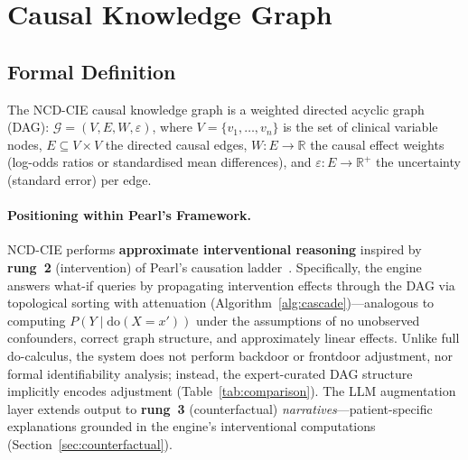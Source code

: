 \documentclass[runningheads]{llncs}
\begin{document}
\section{Causal Knowledge Graph}\label{sec:kg}

\subsection{Formal Definition}\label{sec:formal}

The NCD-CIE causal knowledge graph is a weighted directed
acyclic graph (DAG):
$\mathcal{G} = (V, E, W, \varepsilon)$,
where $V=\{v_1,\ldots,v_n\}$ is the set of clinical variable nodes,
$E \subseteq V \times V$ the directed causal edges,
$W: E \rightarrow \mathbb{R}$ the causal effect weights
(log-odds ratios or standardised mean differences), and
$\varepsilon: E \rightarrow \mathbb{R}^+$ the uncertainty
(standard error) per edge.

\paragraph{Positioning within Pearl's Framework.}
NCD-CIE performs \textbf{approximate interventional reasoning}
inspired by \textbf{rung~2} (intervention) of Pearl's causation
ladder~\cite{pearl2018book,hernan2020causal}.
Specifically, the engine answers what-if queries by propagating
intervention effects through the DAG via topological sorting with
attenuation (Algorithm~\ref{alg:cascade})---analogous to computing
$P(Y \mid \mathrm{do}(X = x'))$ under the assumptions of no
unobserved confounders, correct graph structure, and approximately
linear effects.
Unlike full do-calculus, the system does not perform backdoor or
frontdoor adjustment, nor formal identifiability analysis;
instead, the expert-curated DAG structure implicitly encodes
adjustment (Table~\ref{tab:comparison}).
The LLM augmentation layer extends output to \textbf{rung~3}
(counterfactual) \emph{narratives}---patient-specific explanations
grounded in the engine's interventional computations
(Section~\ref{sec:counterfactual}).
\end{document}
